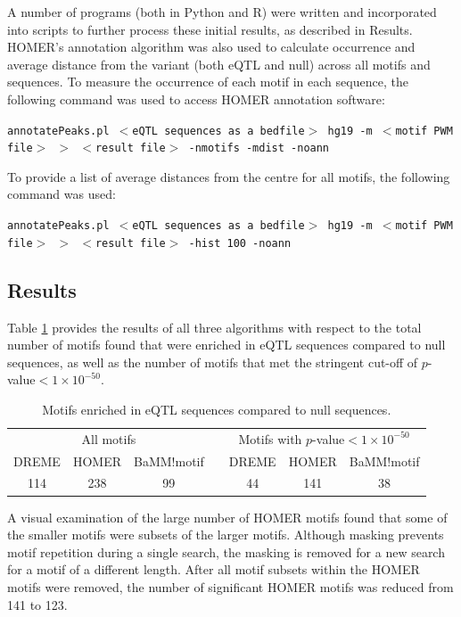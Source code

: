 \documentclass[12pt]{article}
\begin{document}
A number of programs (both in Python and R) were written and incorporated into scripts to further process these initial results, as described in Results. HOMER's annotation algorithm was also used to calculate occurrence and average distance from the variant (both eQTL and null) across all motifs and sequences. To measure the occurrence of each motif in each sequence, the following command was used to access HOMER annotation software:

\texttt{annotatePeaks.pl $<$eQTL sequences as a bedfile$>$ hg19 -m $<$motif PWM file$>$ $>$ $<$result file$>$ -nmotifs -mdist -noann}

To provide a list of average distances from the centre for all motifs, the following command was used:

\texttt{annotatePeaks.pl $<$eQTL sequences as a bedfile$>$ hg19 -m $<$motif PWM file$>$ $>$ $<$result file$>$ -hist 100 -noann}


\subsection{Results}

Table \ref{eQTLmotifNumbers} provides the results of all three algorithms with respect to the total number of motifs found that were enriched in eQTL sequences compared to null sequences, as well as the number of motifs that met the stringent cut-off of $p$-value$<1\times10^{-50}$.



\begin{table}[!htbp]
\caption{Motifs enriched in eQTL sequences compared to null sequences.}
\label{eQTLmotifNumbers}
\centering
\begin{tabular}{ccccccc}
\toprule[0.2em]
\multicolumn{3}{c}{All motifs} & & \multicolumn{3}{c}{Motifs with $p$-value$<1\times10^{-50}$}\\
\cmidrule[0.1em]{1-3}
\cmidrule[0.1em]{5-7}
DREME & HOMER & BaMM!motif && DREME & HOMER & BaMM!motif\\
114 & 238 & 99 && 44 & 141 & 38\\
\bottomrule[0.2em]
\end{tabular}
\end{table}

A visual examination of the large number of HOMER motifs found that some of the smaller motifs were subsets of the larger motifs. Although masking prevents motif repetition during a single search, the masking is removed for a new search for a motif of a different length. After all motif subsets within the HOMER motifs were removed, the number of significant HOMER motifs was reduced from 141 to 123.
\end{document}

